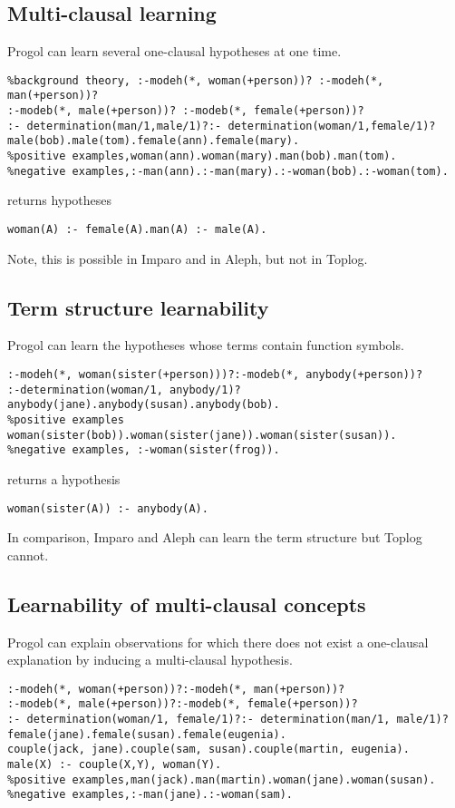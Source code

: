 \subsection{Multi-clausal learning}
Progol can learn several one-clausal hypotheses at one time.

\begin{lstlisting}
%background theory, :-modeh(*, woman(+person))? :-modeh(*, man(+person))?
:-modeb(*, male(+person))? :-modeb(*, female(+person))?
:- determination(man/1,male/1)?:- determination(woman/1,female/1)?
male(bob).male(tom).female(ann).female(mary).
%positive examples,woman(ann).woman(mary).man(bob).man(tom).
%negative examples,:-man(ann).:-man(mary).:-woman(bob).:-woman(tom).
\end{lstlisting}

returns hypotheses

\begin{lstlisting}
woman(A) :- female(A).man(A) :- male(A).
\end{lstlisting}

Note, this is possible in Imparo and in Aleph, but not in Toplog.

\subsection{Term structure learnability}
Progol can learn the hypotheses whose terms contain function symbols.
\begin{lstlisting}
:-modeh(*, woman(sister(+person)))?:-modeb(*, anybody(+person))?
:-determination(woman/1, anybody/1)?
anybody(jane).anybody(susan).anybody(bob).
%positive examples
woman(sister(bob)).woman(sister(jane)).woman(sister(susan)).
%negative examples, :-woman(sister(frog)).
\end{lstlisting}
returns a hypothesis
\begin{lstlisting}
woman(sister(A)) :- anybody(A).
\end{lstlisting}
In comparison, Imparo and Aleph can learn the term structure but Toplog cannot.

\subsection{Learnability of multi-clausal concepts}
Progol can explain observations for which there does not exist a one-clausal explanation by inducing a multi-clausal hypothesis.
\begin{lstlisting}
:-modeh(*, woman(+person))?:-modeh(*, man(+person))?
:-modeb(*, male(+person))?:-modeb(*, female(+person))?
:- determination(woman/1, female/1)?:- determination(man/1, male/1)?
female(jane).female(susan).female(eugenia).
couple(jack, jane).couple(sam, susan).couple(martin, eugenia).
male(X) :- couple(X,Y), woman(Y).
%positive examples,man(jack).man(martin).woman(jane).woman(susan).
%negative examples,:-man(jane).:-woman(sam).
\end{lstlisting}

